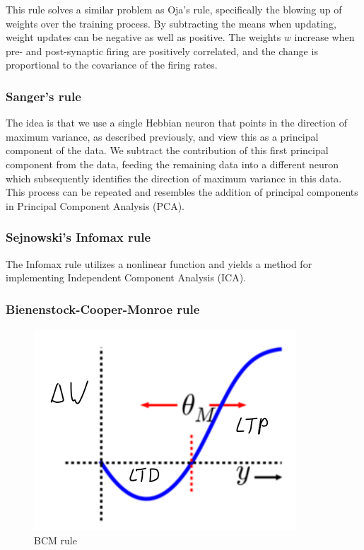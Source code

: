 \documentclass[main]{subfiles}
\begin{document}
This rule solves a similar problem as Oja's rule, specifically the blowing up of weights over the training process. By subtracting the means when updating, weight updates can be negative as well as positive. The weights $w$ increase when pre- and post-synaptic firing are positively correlated, and the change is proportional to the covariance of the firing rates.

\subsubsection{Sanger's rule}

The idea is that we use a single Hebbian neuron that points in the direction of maximum variance, as described previously, and view this as a principal component of the data. We subtract the contribution of this first principal component from the data, feeding the remaining data into a different neuron which subsequently identifies the direction of maximum variance in this data. This process can be repeated and resembles the addition of principal components in Principal Component Analysis (PCA).

\subsubsection{Sejnowski's Infomax rule}

The Infomax rule utilizes a nonlinear function and yields a method for implementing Independent Component Analysis (ICA).

\subsubsection{Bienenstock-Cooper-Monroe rule}

\begin{figure}[H]
		\centering
		\includegraphics[width=0.5\linewidth]{04_LearningRules/figures/4_3_bcm.png}
		\caption{BCM rule}
		\label{fig:4_bcm}
	\end{figure}
\end{document}
